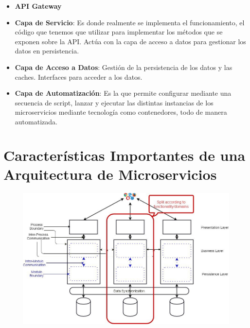\documentclass[12pt]{report} %
\begin{document}
\begin{itemize}
\begin{table}[H]
\begin{tabular}{l|c|c|}
		& Necesito conocer la Clase del Objeto & \begin{tabular}[c]{@{}c@{}}No tiene por qué ser conocido \\ el tipo de datos previamente\end{tabular} \\ \hline
		& Si & No \\ \hline
		\end{tabular}
		\caption{Diferencias entre SOAP y ReST}
	\end{table}
	\item \textbf{API Gateway}
	\item \textbf{Capa de Servicio}: Es donde realmente se implementa el funcionamiento, el código que tenemos que utilizar para implementar los métodos que se exponen sobre la API. Actúa con la capa de acceso a datos para gestionar los datos en persistencia.
	\item \textbf{Capa de Acceso a Datos}: Gestión de la persistencia de los datos y las caches. Interfaces para acceder a los datos.
	\item \textbf{Capa de Automatización}: Es la que permite configurar mediante una secuencia de script, lanzar y ejecutar las distintas instancias de los microservicios mediante tecnología como contenedores, todo de manera automatizada. 
\end{itemize}

\section{Características Importantes de una Arquitectura de Microservicios}
\begin{figure}[H]
	{\includegraphics[scale=.3]{0_W5T2tfcKgudQZYnu.jpeg}}
\end{figure}
\end{document}
